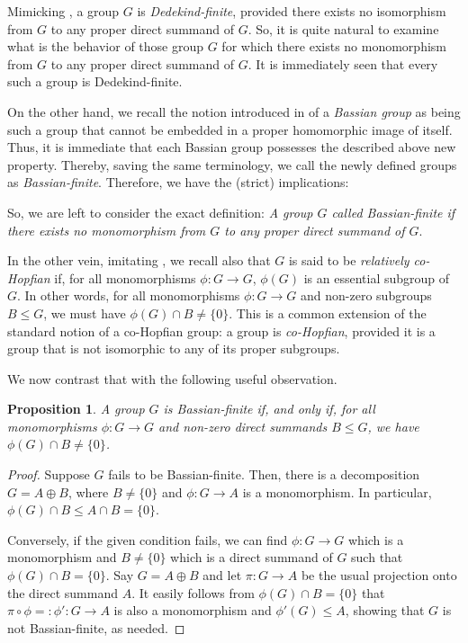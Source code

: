 \documentclass[12pt]{amsart}
\newtheorem{proposition}[theorem]{Proposition}
\theoremstyle{definition}
\begin{document}
\medskip

Mimicking \cite{BP}, a group $G$ is {\it Dedekind-finite}, provided there exists no isomorphism from $G$ to any proper direct summand of $G$. So, it is quite natural to examine what is the behavior of those group $G$ for which there exists no monomorphism from $G$ to any proper direct summand of $G$. It is immediately seen that every such a group is Dedekind-finite.

On the other hand, we recall the notion introduced in \cite{CDG} of a {\it Bassian group} as being such a group that cannot be embedded in a proper homomorphic image of itself. Thus, it is immediate that each Bassian group possesses the described above new property. Thereby, saving the same terminology, we call the newly defined groups as {\it Bassian-finite}. Therefore, we have the (strict) implications:

\medskip


\medskip

So, we are left to consider the exact definition: {\it A group $G$ called Bassian-finite if there exists no monomorphism from $G$ to any proper direct summand of $G$}.

\medskip

In the other vein, imitating \cite{CDK}, we recall also that $G$ is said to be {\it relatively co-Hopfian} if, for all monomorphisms $\phi:G\to G$, $\phi(G)$ is an essential subgroup of $G$. In other words, for all monomorphisms $\phi:G\to G$ and non-zero subgroups $B\leq G$, we must have $\phi(G)\cap B\ne \{0\}$. This is a common extension of the standard notion of a co-Hopfian group: a group is {\it co-Hopfian}, provided it is a group that is not isomorphic to any of its proper subgroups.

\medskip

We now contrast that with the following useful observation.

\begin{proposition}\label{condition}
A group $G$ is Bassian-finite if, and only if, for all monomorphisms $\phi:G\to G$ and non-zero direct summands $B\leq G$, we have $\phi(G)\cap B\ne \{0\}$.
\end{proposition}

\begin{proof}
Suppose $G$ fails to be Bassian-finite. Then, there is a decomposition $G=A\oplus B$, where $B\ne \{0\}$ and $\phi:G\to A$ is a monomorphism. In particular, $\phi(G)\cap B\leq A\cap B=\{0\}$.

Conversely, if the given condition fails, we can find $\phi:G\to G$ which is a monomorphism and $B\ne \{0\}$ which is a direct summand of $G$ such that $\phi(G)\cap B=\{0\}$. Say $G=A\oplus B$ and let $\pi:G\to A$ be the usual projection onto the direct summand $A$. It easily follows from $\phi(G)\cap B=\{0\}$ that $\pi \circ \phi=: \phi':G\to A$ is also a monomorphism and $\phi'(G)\leq A$, showing that $G$ is not Bassian-finite, as needed.
\end{proof}
\end{document}
